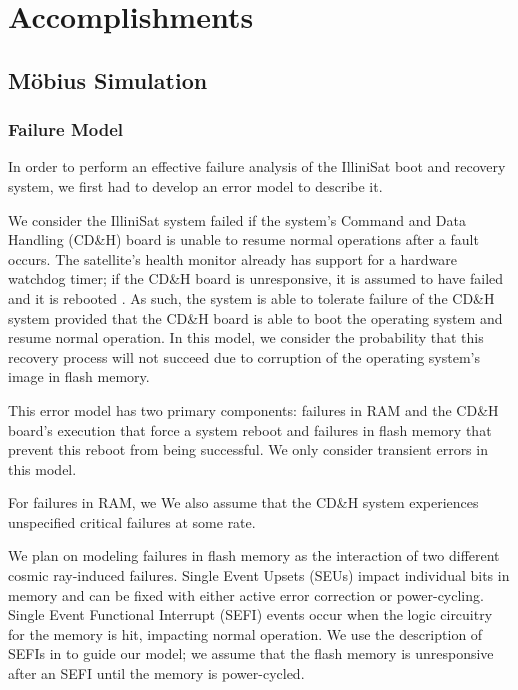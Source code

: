 \section{Accomplishments}

\subsection{M\"obius Simulation}

\subsubsection{Failure Model}

In order to perform an effective failure analysis of the IlliniSat boot and recovery system, we first had to develop an error model to describe it.

We consider the IlliniSat system failed if the system's Command and Data Handling (CD\&H) board is unable to resume normal operations after a fault occurs.  The satellite's health monitor already has support for a hardware watchdog timer; if the CD\&H board is unresponsive, it is assumed to have failed and it is rebooted \cite{jagannatha2014command}.  As such, the system is able to tolerate failure of the CD\&H system provided that the CD\&H board is able to boot the operating system and resume normal operation.  In this model, we consider the probability that this recovery process will not succeed due to corruption of the operating system's image in flash memory.

This error model has two primary components: failures in RAM and the CD\&H board's execution that force a system reboot and failures in flash memory that prevent this reboot from being successful.  We only consider transient errors in this model.

For failures in RAM, we   We also assume that the CD\&H system experiences unspecified critical failures at some rate.

We plan on modeling failures in flash memory as the interaction of two different cosmic ray-induced failures.  Single Event Upsets (SEUs) impact individual bits in memory and can be fixed with either active error correction or power-cycling.  Single Event Functional Interrupt (SEFI) events occur when the logic circuitry for the memory is hit, impacting normal operation.  We use the description of SEFIs in \cite{Gerardin2010Present} to guide our model; we assume that the flash memory is unresponsive after an SEFI until the memory is power-cycled.


